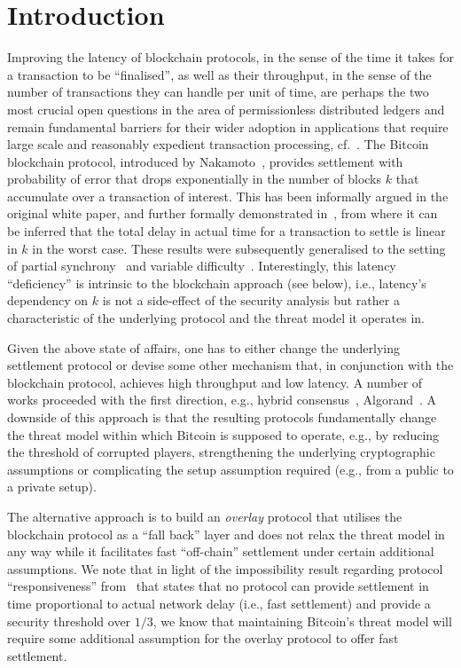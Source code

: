 
\section{Introduction}
\label{sec:intro}

Improving the latency of blockchain protocols, in the sense of the time it takes
for a transaction to be ``finalised'', as well as their throughput, in the sense
of the number of transactions they can handle per unit of time, are perhaps the
two most crucial open questions in the area of permissionless distributed
ledgers and remain fundamental barriers for their wider adoption in applications
that require large scale and reasonably expedient transaction processing,
cf.~\cite{scaling}. The Bitcoin blockchain protocol, introduced by
Nakamoto~\cite{bitcoin}, provides settlement with probability of error that
drops exponentially in the number of blocks $k$ that accumulate over a
transaction of interest. This has been informally argued in the original white
paper, and further formally demonstrated in~\cite{gkl}, from where it can be
inferred that the total delay in actual time for a transaction to settle is
linear in $k$ in the worst case. These results were subsequently generalised to
the setting of partial synchrony~\cite{PSS16} and variable
difficulty~\cite{DBLP:conf/crypto/GarayKL17}. Interestingly, this latency
``deficiency'' is intrinsic to the blockchain approach (see below), i.e.,
latency's dependency on $k$ is not a side-effect of the security analysis but
rather a characteristic of the underlying protocol and the threat model it
operates in.

Given the above state of affairs, one has to either change the underlying
settlement protocol or devise some other mechanism that, in conjunction with the
blockchain protocol, achieves high throughput and low latency. A number of works
proceeded with the first direction, e.g., hybrid
consensus~\cite{DBLP:conf/wdag/PassS17},
Algorand~\cite{DBLP:journals/corr/Micali16}. A downside of this approach is that
the resulting protocols fundamentally change the threat model within which
Bitcoin is supposed to operate, e.g., by reducing the threshold of corrupted
players, strengthening the underlying cryptographic assumptions or complicating
the setup assumption required (e.g., from a public to a private setup).

The alternative approach is to build an \emph{overlay} protocol that utilises
the blockchain protocol as a ``fall back'' layer and does not relax the threat
model in any way while it facilitates fast ``off-chain'' settlement under
certain additional assumptions.  We note that in light of the impossibility
result regarding protocol ``responsiveness'' from~\cite{DBLP:conf/wdag/PassS17}
that states that no protocol can provide settlement in time proportional to
actual network delay (i.e., fast settlement) and provide a security threshold
over $1/3$, we know that maintaining Bitcoin's threat model will require some
additional assumption for the overlay protocol to offer fast settlement.

